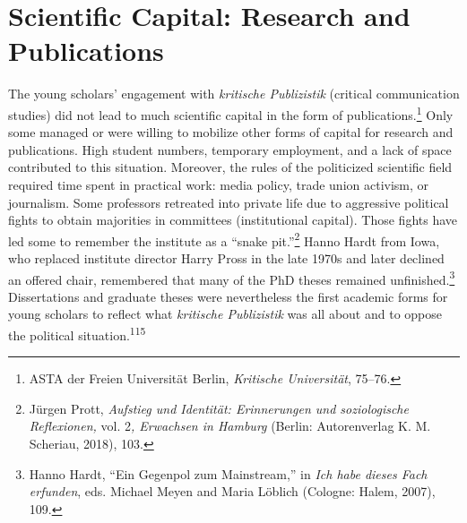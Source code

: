 \documentclass{tufte-handout}
\begin{document}
\hypertarget{scientific-capital-research-and-publications}{%
\section{Scientific Capital: Research and
Publications}\label{scientific-capital-research-and-publications}}

The young scholars' engagement with \emph{kritische Publizistik}
(critical communication studies) did not lead to much scientific capital
in the form of publications.\footnote{ASTA der Freien Universität
  Berlin, \emph{Kritische Universität}, 75--76.} Only some managed or
were willing to mobilize other forms of capital for research and
publications. High student numbers, temporary employment, and a lack of
space contributed to this situation. Moreover, the rules of the
politicized scientific field required time spent in practical work:
media policy, trade union activism, or journalism. Some professors
retreated into private life due to aggressive political fights to obtain
majorities in committees (institutional capital). Those fights have led
some to remember the institute as a ``snake pit.''\footnote{Jürgen
  Prott, \emph{Aufstieg und Identität: Erinnerungen und soziologische
  Reflexionen,} vol. 2\emph{, Erwachsen in Hamburg} (Berlin:
  Autorenverlag K. M. Scheriau, 2018), 103.} Hanno Hardt from Iowa, who
replaced institute director Harry Pross in the late 1970s and later
declined an offered chair, remembered that many of the PhD theses
remained unfinished.\footnote{Hanno Hardt, ``Ein Gegenpol zum
  Mainstream,'' in \emph{Ich habe dieses Fach erfunden}, eds. Michael
  Meyen and Maria Löblich (Cologne: Halem, 2007), 109.} Dissertations
and graduate theses were nevertheless the first academic forms for young
scholars to reflect what \emph{kritische Publizistik} was all about and
to oppose the political situation.\textsuperscript{115}
\end{document}
